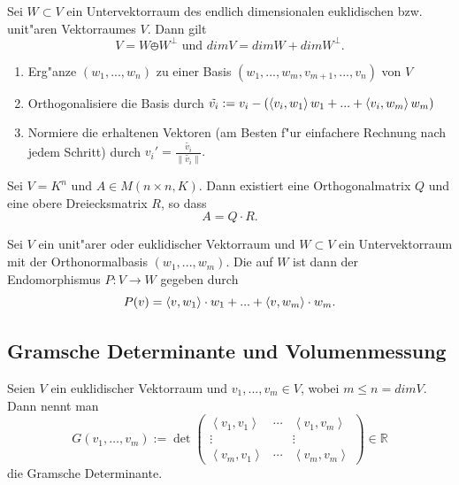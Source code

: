 \documentclass[11pt, a4paper]{article}
\begin{document}
\begin{corollary}
Sei $W \subset V$ ein Untervektorraum des endlich dimensionalen euklidischen bzw. unit"aren Vektorraumes $V$. Dann gilt
$$
V = W \obot W^\perp \text{ und } dim V = dim W + dim W^\perp.
$$
\end{corollary}

\begin{remark}
\begin{enumerate}
\item Erg"anze $(w_1, ..., w_n)$ zu einer Basis $(w_1, ..., w_m, v_{m+1}, ..., v_n)$ von $V$
\item Orthogonalisiere die Basis durch $\tilde{v_i} := v_i - \left( \left\langle {v_i} , {w_1} \right\rangle  w_1 +  ...  + \left\langle {v_i} , {w_m} \right\rangle w_m  \right)$ 
\item Normiere die erhaltenen Vektoren (am Besten f"ur einfachere Rechnung nach jedem Schritt) durch $v_i' = \frac{\tilde{v_i}}{\|\tilde{v_i}\|}.$
\end{enumerate}
\end{remark}

\begin{remark} 
Sei $V = K^n$ und $A \in M(n \times n, K)$. Dann existiert eine Orthogonalmatrix  $Q$ und eine obere Dreiecksmatrix $R$, so dass $$
A = Q \cdot R.$$
\end{remark}

\begin{definition}
Sei $V$ ein unit"arer oder euklidischer Vektorraum und $W \subset V$ ein Untervektorraum mit der Orthonormalbasis $(w_1, ..., w_m)$.
Die  auf $W$ ist dann der Endomorphismus $P : V \rightarrow W$ gegeben durch 
$$P(v) = \left\langle {v} , {w_1} \right\rangle \cdot w_1 + ... + \left\langle {v} , {w_m} \right\rangle\cdot w_m.$$
\end{definition}
\subsection{Gramsche Determinante und Volumenmessung}

\begin{definition}
Seien $V$ ein euklidischer Vektorraum und $v_1, ..., v_m \in V$, wobei $m \leq n = dim V$.
Dann nennt man 
$$
G\left(v_{1}, \ldots, v_{m}\right):=\operatorname{det}\left(\begin{array}{ccc}\left\langle v_{1}, v_{1}\right\rangle & \cdots & \left\langle v_{1}, v_{m}\right\rangle \\ \vdots & & \vdots \\ \left\langle v_{m}, v_{1}\right\rangle & \cdots & \left\langle v_{m}, v_{m}\right\rangle\end{array}\right) \in \mathbb{R}
$$
die Gramsche Determinante.
\end{definition}
\end{document}
